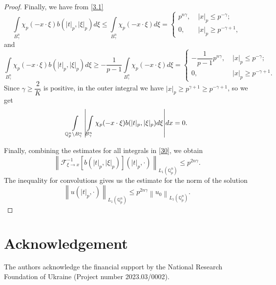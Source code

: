 \documentclass[14pt]{article}
\DeclarePairedDelimiter\abs{\lvert}{\rvert}
\newcommand{\norm}[1]{\left\lVert#1\right\rVert}
\theoremstyle{theorem}
\theoremstyle{theorem}
\theoremstyle{definition}
\theoremstyle{lemma}
\newcommand{\Label}[1]{\label{#1}}
\numberwithin{equation}{section}
\begin{document}
\begin{proof}
Finally, we have from \eqref{3.1}
$$\int\limits_{B_{\gamma}^n}\chi_p(-x\cdot\xi)b(|t|_p,|\xi|_p)d\xi\leq\int\limits_{ B_{\gamma}^n}\chi_p(-x\cdot\xi)d\xi=
\left\{
\begin{array}{ll}
p^{n\gamma},\;&|x|_p\leq p^{-\gamma};\\
0,\;&|x|_p\geq p^{-\gamma+1},
\end{array}
\right.$$
and
$$\int\limits_{B_{\gamma}^n}\chi_p(-x\cdot\xi)b(|t|_p,|\xi|_p)d\xi\geq-\frac{1}{p-1}\int\limits_{B_{\gamma}^n}\chi_p(-x\cdot\xi)d\xi=
\left\{
\begin{array}{ll}
-\dfrac{1}{p-1}p^{n\gamma},\;&|x|_p\leq p^{-\gamma};\\
0,\;&|x|_p\geq p^{-\gamma+1}.
\end{array}
\right.$$
Since $\gamma\geq\dfrac{2}{K}$ is positive, in the outer integral we have $|x|_p\geq p^{\gamma+1}\geq p^{-\gamma+1}$, so we get
$$\int\limits_{\mathbb{Q}_p^n\setminus B_{\gamma}^n}\abs*{\int\limits_{B_{\gamma}^n}\chi_p(-x\cdot\xi)b(|t|_p,|\xi|_p)d\xi}dx=0.$$

Finally, combining the estimates for all integrals in \eqref{30}, we obtain
\begin{equation}\Label{31}
\norm{\mathcal{F}_{\xi\to x}^{-1}[b(|t|_p,|\xi|_p)](|t|_p,\cdot)}_{L_1(\mathbb{Q}_p^n)}\leq p^{2n\gamma}.
\end{equation}
The inequality for convolutions gives us the estimate for the norm of the solution
\begin{equation}\Label{31}
\norm{u(|t|_p,\cdot)}_{L_1(\mathbb{Q}_p^n)}\leq p^{2n\gamma}\norm{u_0}_{L_1(\mathbb{Q}_p^n)}.
\end{equation}
\end{proof}

\section*{Acknowledgement}
The authors acknowledge the financial support by the National Research Foundation of Ukraine (Project number 2023.03/0002).
\end{document}
